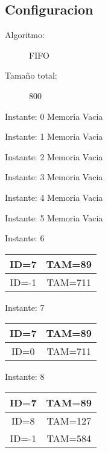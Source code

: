 \documentclass[10pt,a4paper]{article}
\begin{document}
\begin{center}
\section*{Configuracion}
\begin{description}
\item[Algoritmo:] FIFO 
\item[Tamaño total:] 800 
\end{description}
\end{center}
\begin{center}
Instante: 0
Memoria Vacia\\
\end{center}
\begin{center}
Instante: 1
Memoria Vacia\\
\end{center}
\begin{center}
Instante: 2
Memoria Vacia\\
\end{center}
\begin{center}
Instante: 3
Memoria Vacia\\
\end{center}
\begin{center}
Instante: 4
Memoria Vacia\\
\end{center}
\begin{center}
Instante: 5
Memoria Vacia\\
\end{center}
\begin{center}

Instante: 6

\begin{tabular}{|c|c|}
\hline
ID=7 & TAM=89 \\ \hline
ID=-1 & TAM=711 \\ \hline
\end{tabular}
\end{center}
\pagebreak
\begin{center}

Instante: 7

\begin{tabular}{|c|c|}
\hline
ID=7 & TAM=89 \\ \hline
ID=0 & TAM=711 \\ \hline
\end{tabular}
\end{center}
\pagebreak
\begin{center}

Instante: 8

\begin{tabular}{|c|c|}
\hline
ID=7 & TAM=89 \\ \hline
ID=8 & TAM=127 \\ \hline
ID=-1 & TAM=584 \\ \hline
\end{tabular}
\end{center}
\end{document}
